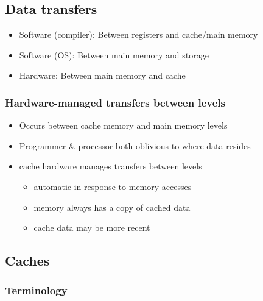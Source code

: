 \documentclass{article}
\begin{document}
\subsection{Data transfers}


\begin{itemize}
	\item Software (compiler): Between registers and cache/main memory
	\item Software (OS): Between main memory and storage
	\item Hardware: Between main memory and cache
\end{itemize}


\subsubsection{Hardware-managed transfers between levels}


\begin{itemize}
	\item Occurs between cache memory and main memory levels
	\item Programmer \& processor both oblivious to where data resides
	\item cache hardware manages transfers between levels \begin{itemize}
		      \item automatic in response to memory accesses
		      \item memory always has a copy of cached data
		      \item cache data may be more recent
	      \end{itemize}
\end{itemize}

\subsection{Caches}


\subsubsection{Terminology}
\end{document}
